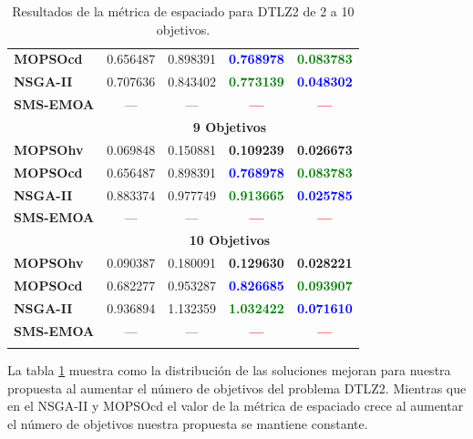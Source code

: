 \begin{longtable}{|l|cc|cc|}
	\textbf{MOPSOcd} & 0.656487 & 0.898391 & \textbf{\textcolor{blue}{0.768978}} & \textbf{\textcolor{green}{0.083783}} \\ 
	\textbf{NSGA-II} & 0.707636 & 0.843402 & \textbf{\textcolor{green}{0.773139}} & \textbf{\textcolor{blue}{0.048302}} \\ 
	\textbf{SMS-EMOA} & --- & --- &\textbf{\textcolor{red}{ ---}} & \textbf{\textcolor{red}{--- }}\\
	\hline\hline
 & \multicolumn{4}{|c|}{\textbf{9 Objetivos}} \\ 
	\hline\hline
	\textbf{MOPSOhv} &0.069848 & 0.150881 & \textbf{0.109239} & \textbf{0.026673}   \\ 
	\textbf{MOPSOcd} & 0.656487 & 0.898391 & \textbf{\textcolor{blue}{0.768978}} & \textbf{\textcolor{green}{0.083783}} \\ 
	\textbf{NSGA-II} &0.883374 & 0.977749 & \textbf{\textcolor{green}{0.913665}} & \textbf{\textcolor{blue}{0.025785}} \\ 
	\textbf{SMS-EMOA} & --- & --- & \textbf{\textcolor{red}{---}} &\textbf{\textcolor{red}{ ---}} \\
	\hline\hline
 & \multicolumn{4}{|c|}{\textbf{10 Objetivos}} \\ 
	\hline\hline
	\textbf{MOPSOhv} &0.090387 & 0.180091 & \textbf{0.129630} & \textbf{0.028221}    \\ 
	\textbf{MOPSOcd} &0.682277 & 0.953287 & \textbf{\textcolor{blue}{0.826685}} & \textbf{\textcolor{green}{0.093907}}  \\ 
	\textbf{NSGA-II} &0.936894 & 1.132359 & \textbf{\textcolor{green}{1.032422}} & \textbf{\textcolor{blue}{0.071610}}\\  
	\textbf{SMS-EMOA} & --- & --- & \textbf{\textcolor{red}{---}} &\textbf{\textcolor{red}{ ---}} \\
	\hline\hline
\caption{Resultados de la m\'etrica de espaciado para DTLZ2 de 2 a 10 objetivos.}
  \label{tab:dtlz2_es}
\end{longtable}
 
 La tabla \ref{tab:dtlz2_es} muestra como la distribuci\'on de las soluciones mejoran para nuestra propuesta al aumentar el n\'umero 
 de objetivos del problema DTLZ2. Mientras que en el NSGA-II y MOPSOcd el valor de la m\'etrica de espaciado crece al aumentar el n\'umero
 de objetivos nuestra propuesta se mantiene constante.
 
